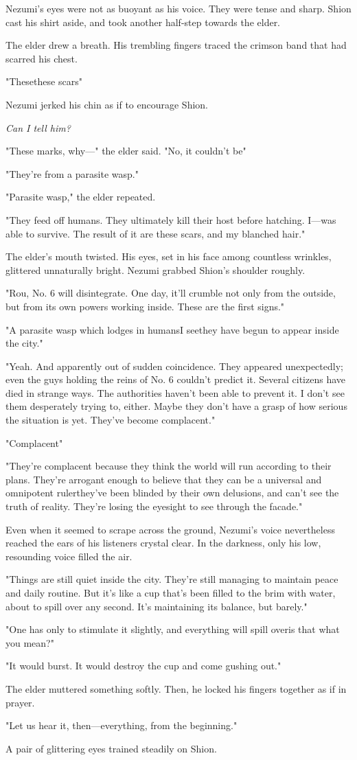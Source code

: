 Nezumi's eyes were not as buoyant as his voice. They were tense and
sharp. Shion cast his shirt aside, and took another half-step towards
the elder.

The elder drew a breath. His trembling fingers traced the crimson band
that had scarred his chest.

"These\el these scars\el "

Nezumi jerked his chin as if to encourage Shion.

\emph{Can I tell him?}

"These marks, why---" the elder said. "No, it couldn't be\el "

"They're from a parasite wasp."

"Parasite wasp," the elder repeated.

"They feed off humans. They ultimately kill their host before hatching.
I---was able to survive. The result of it are these scars, and my blanched
hair."

The elder's mouth twisted. His eyes, set in his face among countless
wrinkles, glittered unnaturally bright. Nezumi grabbed Shion's shoulder
roughly.

"Rou, No. 6 will disintegrate. One day, it'll crumble not only from the
outside, but from its own powers working inside. These are the first
signs."

"A parasite wasp which lodges in humans\el I see\el they have begun to
appear inside the city."

"Yeah. And apparently out of sudden coincidence. They appeared
unexpectedly; even the guys holding the reins of No. 6 couldn't predict
it. Several citizens have died in strange ways. The authorities haven't
been able to prevent it. I don't see them desperately trying to, either.
Maybe they don't have a grasp of how serious the situation is yet.
They've become complacent."

"Complacent\el "

"They're complacent because they think the world will run according to
their plans. They're arrogant enough to believe that they can be a
universal and omnipotent ruler\el they've been blinded by their own
delusions, and can't see the truth of reality. They're losing the
eyesight to see through the facade."

Even when it seemed to scrape across the ground, Nezumi's voice
nevertheless reached the ears of his listeners crystal clear. In the
darkness, only his low, resounding voice filled the air.

"Things are still quiet inside the city. They're still managing to
maintain peace and daily routine. But it's like a cup that's been filled
to the brim with water, about to spill over any second. It's maintaining
its balance, but barely."

"One has only to stimulate it slightly, and everything will spill
over\el is that what you mean?"

"It would burst. It would destroy the cup and come gushing out."

The elder muttered something softly. Then, he locked his fingers
together as if in prayer.

"Let us hear it, then---everything, from the beginning."

A pair of glittering eyes trained steadily on Shion.